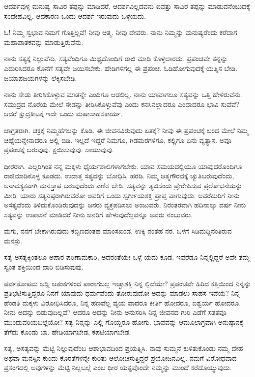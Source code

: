 ಆದರ್ಶವುಳ್ಳ ಮನುಷ್ಯ ಸಾವಿರ ತಪ್ಪನ್ನು ಮಾಡಿದರೆ, ಆದರ್ಶವಿಲ್ಲದವನು ಐವತ್ತು ಸಾವಿರ ತಪ್ಪನ್ನು ಮಾಡುವನೆಂಬುದಕ್ಕೆ ಸಂದೇಹವಿಲ್ಲ. ಆದಕಾರಣ ಒಂದು ಆದರ್ಶ ಇರುವುದು ಒಳ್ಳೆಯದು.

ಓ! ನಿಮ್ಮ ಸ್ವಭಾವ ನಿಮಗೆ ಗೊತ್ತಿಲ್ಲವೆ! ನೀವು ಆತ್ಮ. ನೀವು ದೇವರು. ನಾನು ನಿಮ್ಮನ್ನು ಮನುಷ್ಯರೆಂದು ಕರೆದಾಗ ಮಹಾಪಾತಕವನ್ನು ಮಾಡುತ್ತಿರುವೆನು.

ನಾನು ಸತ್ಯಕ್ಕೆ ನಿಲ್ಲುವೆನು. ಸತ್ಯವೆಂದಿಗೂ ಮಿಥ್ಯದೊಂದಿಗೆ ರಾಜಿ ಮಾಡಿ ಕೊಳ್ಳಲಾರದು. ಪ್ರಪಂಚವೇ ತನ್ನನ್ನು ಎದುರಿಸಿದರೂ ಕೊನೆಗೆ ಸತ್ಯವೇ ಜಯಿಸಬೇಕು. ಹೇಡಿಗಳಿಗಲ್ಲ ಈ ಪ್ರಪಂಚ. ಓಡಿಹೋಗುವುದಕ್ಕೆ ಯತ್ನಿಸ ಬೇಡಿ. ಜಯಾಪಜಯಗಳನ್ನು ಲೆಕ್ಕಿಸಬೇಡಿ.

ನಾನು ಸೇಡು ತೀರಿಸಿಕೊಳ್ಳುವ ಮಾತನ್ನೇ ಎಂದಿಗೂ ಆಡಲಿಲ್ಲ. ನಾನು ಯಾವಾಗಲೂ ಸತ್ಯವನ್ನು ಒತ್ತಿ ಹೇಳಿರುವೆನು. ಸಮುದ್ರದ ನೊರೆಯ ಮೇಲೆ ಸೇಡನ್ನು ತೀರಿಸಿಕೊಳ್ಳುವೆವು ಎಂದು ಕನಸಿನಲ್ಲಾದರೂ ಎಂದಾದರೂ ಭಾವಿ ಸುವೆವೆ? ಆದರೆ ಕ್ಷುದ್ರಕೀಟಕ್ಕೆ ಇದೇ ಒಂದು ಮಹಾಸಾಹಸಕಾರ್ಯ.

ಜಾಗ್ರತರಾಗಿ. ಚಕ್ರಕ್ಕೆ ನಿಮ್ಮಹೆಗಲನ್ನು ಕೊಡಿ. ಈ ಜೀವನವಿರುವುದು ಏತಕ್ಕೆ? ನೀವು ಈ ಪ್ರಪಂಚಕ್ಕೆ ಬಂದ ಮೇಲೆ ನಿಮ್ಮ ಚಿಹ್ನೆಯನ್ನೇನಾದರೂ ಅಲ್ಲಿ ಬಿಡಿ. ಇಲ್ಲದೆ ಇದ್ದರೆ ನಿಮಗೂ, ಗಿಡಮರಗಳಿಗೂ, ಕಲ್ಲಿಗೂ ಏನು ವ್ಯತ್ಯಾಸ. ಅವೂ ಪ್ರಪಂಚಕ್ಕೆ ಬರುವುವು. ಕ್ಷಯಿಸುವುವು. ಸಾಯುವುವು.

ಧೀರರಾಗಿ. ಎಲ್ಲರಿಗಿಂತ ನನ್ನ ಮಕ್ಕಳು ಧೈರ್ಯಶಾಲಿಗಳಾಗಬೇಕು. ಯಾವ ಸಮಯದಲ್ಲಿಯೂ ಯಾವುದರೊಂದಿಗೂ ರಾಜಿಮಾಡಿಕೊಳ್ಳ ಕೂಡದು. ಉದಾತ್ತ ಸತ್ಯವನ್ನು ಬೋಧಿಸಿ, ಹರಡಿ. ನಿಮ್ಮ ಆತ್ಮಗೌರವಕ್ಕೆ ಚ್ಯುತಿಬರುವುದೆಂದು, ಅನಾವಶ್ಯಕವಾಗಿ ಮನಸ್ತಾಪ ಬರುವುದೆಂದು ಎಣಿಸ ಬೇಡಿ. ಸತ್ಯವನ್ನು ತ್ಯಜಿಸೆಂದು ಪ್ರೇರೇಪಿಸುವ ಪ್ರಲೋಭನೆಯನ್ನು ಮೀರಿ. ಯಾರು ಸತ್ಯನಿಷ್ಠರಾಗಿರುವರೋ ಅವರಿಗೆ ಒಂದು ಸ್ವರ್ಗೀಯಶಕ್ತಿ ಪ್ರಾಪ್ತ ವಾಗುವುದು. ಅವರೆದುರಿಗೆ ನೀನು ಅಸತ್ಯವೆಂದು ತಿಳಿದುಕೊಂಡಿರುವುದನ್ನು ಜನರು ವ್ಯಕ್ತಪಡಿಸಲು ಅಂಜುವರು. ನಿರಂತರವಾಗಿ ಹದಿನಾಲ್ಕು ವರ್ಷ ನೀನು ಸತ್ಯವನ್ನು ಉಪಾಸನೆ ಮಾಡಿದರೆ ನೀನು ಜನರಿಗೆ ಹೇಳುವುದೆಲ್ಲವನ್ನೂ ಅವರು ನಂಬುವರು.

ಮಗು, ನನಗೆ ಬೇಕಾಗಿರುವುದು ಕಬ್ಬಿಣದಂತಹ ಮಾಂಸಖಂಡ, ಉಕ್ಕಿ ನಂತಹ ನರ. ಒಳಗೆ ಸಿಡಿಮದ್ದಿನಂತಿರುವ ಮನಸ್ಸು.

ಸತ್ಯ ಅಸತ್ಯಕ್ಕಿಂತಲೂ ಅಪಾರ ಪರಿಣಾಮಕಾರಿ, ಅದರಂತೆಯೇ ಒಳ್ಳೆ ಯದು ಕೂಡ. ಇವರೆಡೂ ನಿನ್ನಲ್ಲಿದ್ದರೆ ಅವೇ ತಮ್ಮ ಸ್ವಂತ ಶಕ್ತಿಯಿಂದ ದಾರಿ ಬಿಡಿಸುವುವು.

ಪರ್ವತೋಪಮ ಅಡ್ಡಿ ಆತಂಕಗಳಿಂದ ಪಾರಾಗಬಲ್ಲ ಇಚ್ಛಾಶಕ್ತಿ ನಿನ್ನ ಲ್ಲಿದೆಯೇ? ಪ್ರಪಂಚವೇ ಹಿರಿದ ಕತ್ತಿಯಿಂದ ನಿನ್ನನ್ನು ಪ್ರತಿಭಟಿಸುತ್ತಿದ್ದರೂ ನಿನಗೆ ಯಾವುದು ಧರ್ಮವೆಂದು ತೋರುವುದೋ ಅದನ್ನು ಮಾಡಲು ಸಾಹಸ ಇದೆಯೆ? ನಿನ್ನ ಹೆಂಡತಿ ಮಕ್ಕಳು ವಿರೋಧಿಸಿದರೂ, ನಿನ್ನ ಹಣವೆಲ್ಲ ವ್ಯಯ ವಾದರೂ ಕೀರ್ತಿ ಹೋದರೂ, ಐಶ್ವರ್ಯ ಹೋದರೂ, ನೀನು ಅದನ್ನು ಬಿಡುವುದಿಲ್ಲವೆ? ಆದರೂ ಅದನ್ನು ನೀನು ಅನುಸರಿಸಿ ನಿನ್ನ ಜೀವನದ ಗುರಿ ಎಡೆಗೆ ಸತತವೂ ಮುಂದುವರಿಯಬಲ್ಲೆಯೋ? ಸತ್ಯ ನಿನ್ನನ್ನು ಎಲ್ಲಿ ಗೊಯ್ದರೂ ಹೋಗು. ಭಾವವನ್ನು ಆಮೂಲಾಗ್ರವಾಗಿ ಅನುಷ್ಠಾನಕ್ಕೆ ತೆಗೆದು ಕೊಂಡು ಬಾ. ಹೇಡಿಯಾಗಬೇಡ, ಕಪಟಿಯಾಗಬೇಡ.

ಸತ್ಯ, ಅಸತ್ಯವನ್ನು ಮೆಟ್ಟಿ ನಿಲ್ಲುವುದೆಂಬ ಆಶಾಭಾವದಿಂದ ಪ್ರಯತ್ನಿಸಿ. ನಾವು ಸುಮ್ಮನೆ ಕುಳಿತುಕೊಂಡು ನಮ್ಮ ದೇಹ ಅಥವಾ ಮನಸ್ಸಿನ ಕುಂದು ಕೊರತೆಗಳನ್ನೇ ಕುರಿತು ಆಲೋಚಿಸುತ್ತಿದ್ದರೆ ಪ್ರಯೋಜನವಿಲ್ಲ. ನಮಗೆ ವಿರೋಧವಾದ ಪ್ರಸಂಗದಲ್ಲಿ ಅವುಗಳನ್ನು ಮೆಟ್ಟಿ ನಿಲ್ಲಬಲ್ಲೆ ಎಂಬ ಧೀರ ಯತ್ನವೊಂದೇ ನಮ್ಮನ್ನು ಮುಂದೆ ಕರೆದೊಯ್ಯುವುದು.


